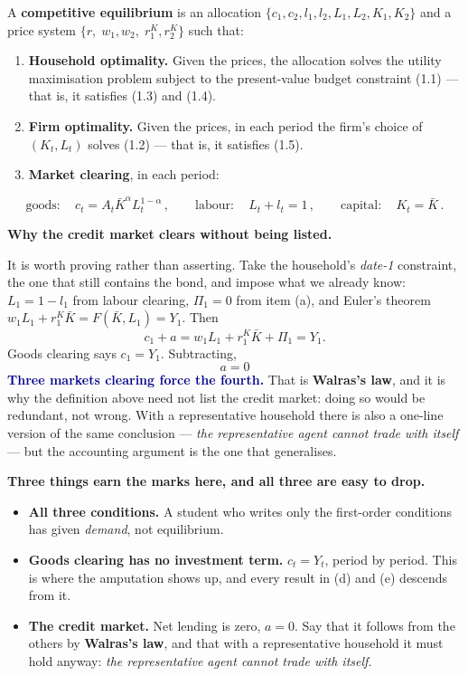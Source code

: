 \documentclass[11pt, a4paper]{article}
\newcommand{\passo}[1]{\medskip\noindent\textbf{#1}\par\nobreak}
\newcommand{\resp}[1]{%
  \ifmmode {\color{darkblue}#1}\else\textcolor{darkblue}{\textbf{#1}}\fi}
\newcommand{\Kb}{\bar K}
\begin{document}
A \textbf{competitive equilibrium} is an allocation
$\{c_1,c_2,l_1,l_2,L_1,L_2,K_1,K_2\}$ and a price system
$\{r,\;w_1,w_2,\;r^K_1,r^K_2\}$ such that:

\begin{enumerate}[label=\textbf{\arabic*.}, leftmargin=2em]
\item \textbf{Household optimality.} Given the prices, the allocation solves the utility
      maximisation problem subject to the present-value budget constraint (1.1) --- that
      is, it satisfies (1.3) and (1.4).
\item \textbf{Firm optimality.} Given the prices, in each period the firm's choice of
      $(K_t,L_t)$ solves (1.2) --- that is, it satisfies (1.5).
\item \textbf{Market clearing}, in each period:
\end{enumerate}
\[
\text{goods:}\quad \boxed{\,c_t=A_t\Kb^{\alpha}L_t^{1-\alpha}\,},
\qquad
\text{labour:}\quad \boxed{\,L_t+l_t=1\,},
\qquad
\text{capital:}\quad \boxed{\,K_t=\Kb\,}.
\tag{1.6}
\]

\passo{Why the credit market clears without being listed.} It is worth proving rather than
asserting. Take the household's \emph{date-1} constraint, the one that still contains the
bond, and impose what we already know: $L_1=1-l_1$ from labour clearing, $\Pi_1=0$ from
item (a), and Euler's theorem $w_1L_1+r^K_1\Kb=F(\Kb,L_1)=Y_1$. Then
\[
c_1+a=w_1L_1+r^K_1\Kb+\Pi_1=Y_1 .
\]
Goods clearing says $c_1=Y_1$. Subtracting,
\[
\boxed{\;a=0\;}
\]
\resp{Three markets clearing force the fourth.} That is \textbf{Walras's law}, and it is
why the definition above need not list the credit market: doing so would be redundant, not
wrong. With a representative household there is also a one-line version of the same
conclusion --- \emph{the representative agent cannot trade with itself} --- but the
accounting argument is the one that generalises.

\begin{tcolorbox}[rubricbox]
\small
\textbf{Three things earn the marks here, and all three are easy to drop.}
\begin{itemize}
\item \textbf{All three conditions.} A student who writes only the first-order conditions
      has given \emph{demand}, not equilibrium.
\item \textbf{Goods clearing has no investment term.} $c_t=Y_t$, period by period. This is
      where the amputation shows up, and every result in (d) and (e) descends from it.
\item \textbf{The credit market.} Net lending is zero, $a=0$. Say that it follows from the
      others by \textbf{Walras's law}, and that with a representative household it must
      hold anyway: \emph{the representative agent cannot trade with itself.}
\end{itemize}
\end{tcolorbox}
\end{document}

